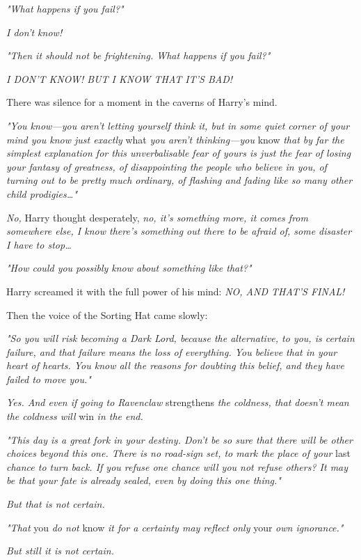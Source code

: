 \emph{"What happens if you fail?"}

\emph{I don't know!}

\emph{"Then it should not be frightening. What happens if you fail?"}

\emph{I DON'T KNOW! BUT I KNOW THAT IT'S BAD!}

There was silence for a moment in the caverns of Harry's mind.

\emph{"You know---you aren't letting yourself think it, but in some quiet corner of your mind you know just exactly} what\emph{ you aren't thinking---you} know \emph{that by far the simplest explanation for this unverbalisable fear of yours is just the fear of losing your fantasy of greatness, of disappointing the people who believe in you, of turning out to be pretty much ordinary, of flashing and fading like so many other child prodigies{\ldots}"}

\emph{No,} Harry thought desperately, \emph{no, it's something more, it comes from somewhere else, I know there's something out there to be afraid of, some disaster I have to stop{\ldots}}

\emph{"How could you possibly know about something like that?"}

Harry screamed it with the full power of his mind: \emph{NO, AND THAT'S FINAL!}

Then the voice of the Sorting Hat came slowly:

\emph{"So you will risk becoming a Dark Lord, because the alternative, to you, is certain failure, and that failure means the loss of everything. You believe that in your heart of hearts. You know all the reasons for doubting this belief, and they have failed to move you."}

\emph{Yes. And even if going to Ravenclaw} strengthens\emph{ the coldness, that doesn't mean the coldness will} win\emph{ in the end.}

\emph{"This day is a great fork in your destiny. Don't be so sure that there will be other choices beyond this one. There is no road-sign set, to mark the place of your} last\emph{ chance to turn back. If you refuse one chance will you not refuse others? It may be that your fate is already sealed, even by doing this one thing."}

\emph{But that is not certain.}

\emph{"That} you\emph{ do not} know\emph{ it for a certainty may reflect only} your\emph{ own ignorance."}

\emph{But still it is not certain.}

